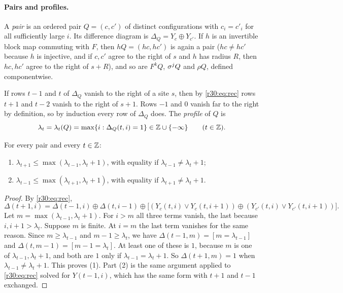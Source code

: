 \paragraph{Pairs and profiles.} A \emph{pair} is an ordered pair $Q=(c,c')$ of distinct configurations with $c_i=c'_i$ for all sufficiently large $i$. Its difference diagram is $\Delta_Q=Y_c\oplus Y_{c'}$. If $h$ is an invertible block map commuting with $F$, then $hQ=(hc,hc')$ is again a pair ($hc\ne hc'$ because $h$ is injective, and if $c,c'$ agree to the right of $s$ and $h$ has radius $R$, then $hc,hc'$ agree to the right of $s+R$), and so are $F^kQ$, $\sigma^jQ$ and $\rho Q$, defined componentwise.

If rows $t-1$ and $t$ of $\Delta_Q$ vanish to the right of a site $s$, then by \eqref{r30:eq:rec} rows $t+1$ and $t-2$ vanish to the right of $s+1$. Rows $-1$ and $0$ vanish far to the right by definition, so by induction every row of $\Delta_Q$ does. The \emph{profile} of $Q$ is
\[
\lambda_t=\lambda_t(Q)=\max\{i:\Delta_Q(t,i)=1\}\in\mathbb{Z}\cup\{-\infty\}\qquad(t\in\mathbb{Z}).
\]

\begin{lemma}\label{r30:lem:R}
For every pair and every $t\in\mathbb{Z}$:
\begin{enumerate}
\item $\lambda_{t+1}\le\max(\lambda_{t-1},\lambda_t+1)$, with equality if $\lambda_{t-1}\ne\lambda_t+1$;
\item $\lambda_{t-1}\le\max(\lambda_{t+1},\lambda_t+1)$, with equality if $\lambda_{t+1}\ne\lambda_t+1$.
\end{enumerate}
\end{lemma}

\begin{proof}
By \eqref{r30:eq:rec},
\[
\Delta(t+1,i)=\Delta(t-1,i)\oplus\Delta(t,i-1)\oplus\bigl[(Y_c(t,i)\vee Y_c(t,i+1))\oplus(Y_{c'}(t,i)\vee Y_{c'}(t,i+1))\bigr].
\]
Let $m=\max(\lambda_{t-1},\lambda_t+1)$. For $i>m$ all three terms vanish, the last because $i,i+1>\lambda_t$. Suppose $m$ is finite. At $i=m$ the last term vanishes for the same reason. Since $m\ge\lambda_{t-1}$ and $m-1\ge\lambda_t$, we have $\Delta(t-1,m)=[m=\lambda_{t-1}]$ and $\Delta(t,m-1)=[m-1=\lambda_t]$. At least one of these is $1$, because $m$ is one of $\lambda_{t-1},\lambda_t+1$, and both are $1$ only if $\lambda_{t-1}=\lambda_t+1$. So $\Delta(t+1,m)=1$ when $\lambda_{t-1}\ne\lambda_t+1$. This proves (1). Part (2) is the same argument applied to \eqref{r30:eq:rec} solved for $Y(t-1,i)$, which has the same form with $t+1$ and $t-1$ exchanged.
\end{proof}

